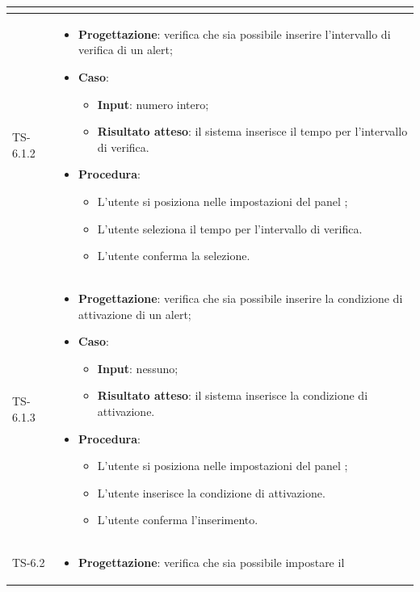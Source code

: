 \begin{longtable}{|C{2.5cm}|C{13cm}|}
\begin{itemize}
\end{itemize}
	  \\
	\hline
	{TS-6.1.2} & 
\begin{itemize}
	\item \textbf{Progettazione}: verifica che sia  possibile inserire
	l'intervallo di verifica di un alert;
	\item \textbf{Caso}: 
	\begin{itemize}
		\item \textbf{Input}: numero intero;
		\item \textbf{Risultato atteso}: il sistema inserisce il tempo per l'intervallo di verifica.
	\end{itemize}
	\item \textbf{Procedura}:
	\begin{itemize}
		\item L'utente si posiziona nelle impostazioni del panel ;
		\item L'utente seleziona il tempo per l'intervallo di verifica.
		\item L'utente conferma la selezione.
	\end{itemize} 
\end{itemize}
  \\
	\hline
	{TS-6.1.3} & 
\begin{itemize}
	\item \textbf{Progettazione}: verifica che sia possibile inserire la
	condizione di attivazione di un alert;
	\item \textbf{Caso}: 
	\begin{itemize}
		\item \textbf{Input}: nessuno;
		\item \textbf{Risultato atteso}: il sistema inserisce la condizione di attivazione.
	\end{itemize}
	\item \textbf{Procedura}:
	\begin{itemize}
		\item L'utente si posiziona nelle impostazioni del panel ;
		\item L'utente inserisce la condizione di attivazione.
		\item L'utente conferma l'inserimento.
	\end{itemize} 
\end{itemize}
	 \\
	\hline
	{TS-6.2} & 
\begin{itemize}
	\item \textbf{Progettazione}: verifica che sia possibile impostare il

\end{itemize}
\end{longtable}
